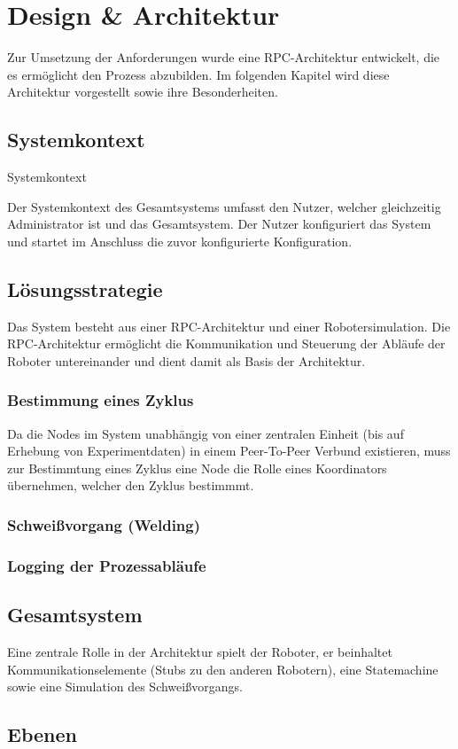 %
\chapter{Design \& Architektur}

Zur Umsetzung der Anforderungen wurde eine RPC-Architektur entwickelt, die es ermöglicht den Prozess
abzubilden. Im folgenden Kapitel wird diese Architektur vorgestellt sowie ihre Besonderheiten.

\section{Systemkontext}

 {Systemkontext}

Der Systemkontext des Gesamtsystems umfasst den Nutzer, welcher gleichzeitig Administrator ist und das
Gesamtsystem. Der Nutzer konfiguriert das System und startet im Anschluss die zuvor
konfigurierte Konfiguration.
\clearpage

\section{Lösungsstrategie}

Das System besteht aus einer RPC-Architektur und einer Robotersimulation. Die RPC-Architektur ermöglicht
die Kommunikation und Steuerung der Abläufe der Roboter untereinander und dient damit als Basis der
Architektur.

\subsection{Bestimmung eines Zyklus}

Da die Nodes im System unabhängig von einer zentralen Einheit (bis auf Erhebung von Experimentdaten)
in einem Peer-To-Peer \citep{tanenbaumvansteen} Verbund existieren, muss zur Bestimmtung 
eines Zyklus eine Node die Rolle eines Koordinators \citep{tanenbaumvansteen} übernehmen, welcher den Zyklus bestimmmt.

\subsection{Schweißvorgang (Welding)}

\subsection{Logging der Prozessabläufe}

\section{Gesamtsystem}



Eine zentrale Rolle in der Architektur spielt der Roboter, er beinhaltet Kommunikationselemente (Stubs 
\citep{tanenbaumvansteen} zu den anderen Robotern), eine Statemachine sowie eine Simulation des
Schweißvorgangs.

\section{Ebenen}
